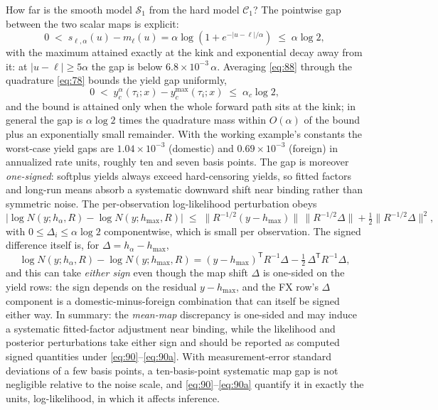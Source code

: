 \documentclass[11pt]{article}
\begin{document}
How far is the smooth model \(\mathcal S_1\) from the hard model
\(\mathcal C_1\)? The pointwise gap between the two scalar maps is
explicit:
\begin{equation}\label{eq:88}
 0\;<\;s_{\ell,\alpha}(u)-m_\ell(u)
 =\alpha\log\!\left(1+e^{-|u-\ell|/\alpha}\right)
 \;\leq\;\alpha\log 2,
\end{equation}
with the maximum attained exactly at the kink and exponential decay
away from it: at \(|u-\ell|\geq5\alpha\) the gap is below
\(6.8\times10^{-3}\,\alpha\). Averaging \eqref{eq:88} through the
quadrature \eqref{eq:78} bounds the yield gap uniformly,
\begin{equation}\label{eq:89}
 0\;<\;y_c^{\alpha}(\tau_i;x)-y_c^{\max}(\tau_i;x)\;\leq\;\alpha_c\log 2,
\end{equation}
and the bound is attained only when the whole forward path sits at the
kink; in general the gap is \(\alpha\log2\) times the quadrature mass
within \(O(\alpha)\) of the bound plus an exponentially small
remainder. With the working example's constants the worst-case yield
gaps are \(1.04\times10^{-3}\) (domestic) and \(0.69\times10^{-3}\)
(foreign) in annualized rate units, roughly ten and seven basis
points. The gap is moreover \emph{one-signed}: softplus
yields always exceed hard-censoring yields, so fitted factors and
long-run means absorb a systematic downward shift near binding rather
than symmetric noise. The per-observation log-likelihood perturbation
obeys
\begin{equation}\label{eq:90}
 \bigl|\log N(y;h_\alpha,R)-\log N(y;h_{\max},R)\bigr|
 \;\leq\;
 \bigl\|R^{-1/2}(y-h_{\max})\bigr\|\,
 \bigl\|R^{-1/2}\Delta\bigr\|
 +\tfrac12\bigl\|R^{-1/2}\Delta\bigr\|^2,
\end{equation}
with \(0\le\Delta_i\le\alpha\log2\) componentwise, which is small per
observation. The signed difference itself is, for
\(\Delta=h_\alpha-h_{\max}\),
\begin{equation}\label{eq:90a}
 \log N(y;h_\alpha,R)-\log N(y;h_{\max},R)
 =(y-h_{\max})^{\mathsf T}R^{-1}\Delta
 -\tfrac12\,\Delta^{\mathsf T}R^{-1}\Delta,
\end{equation}
and this can take \emph{either sign} even though the map shift
\(\Delta\) is one-sided on the yield rows: the sign depends on the
residual \(y-h_{\max}\), and the FX row's \(\Delta\) component is a
domestic-minus-foreign combination that can itself be signed either
way. In summary: the \emph{mean-map}
discrepancy is one-sided and may induce a systematic fitted-factor
adjustment near binding, while the likelihood and posterior
perturbations take either sign and should be reported as computed signed
quantities under
\eqref{eq:90}--\eqref{eq:90a}.
With measurement-error standard deviations of a few basis points,
a ten-basis-point systematic map gap is not negligible relative to the
noise scale, and \eqref{eq:90}--\eqref{eq:90a} quantify it in exactly the
units, log-likelihood, in which it affects inference.
\end{document}

